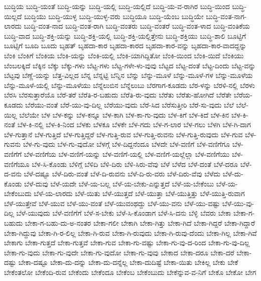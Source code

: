 {ಬುದ್ಧಿಯ
ಬುದ್ಧಿ-ಯಂತೆ
ಬುದ್ಧಿ-ಯನ್ನು
ಬುದ್ಧಿ-ಯಲ್ಲಿ
ಬುದ್ಧಿ-ಯಲ್ಲಿದೆ
ಬುದ್ಧಿ-ಯ-ವ-ರಾಗಿರ
ಬುದ್ಧಿ-ಯಿಂದ
ಬುದ್ಧಿ-ಯಿಲ್ಲದೆ
ಬುದ್ಧಿಯು
ಬುದ್ಧಿ-ಯುಳ್ಳ
ಬುದ್ಧಿ-ಯುಳ್ಳ-ವರು
ಬುದ್ಧಿಯೂ
ಬುದ್ಧಿ-ಯೆಂಬ
ಬುದ್ಧಿಯೇ
ಬುದ್ಧಿ-ವಂತ-ನಾಗ-ಲಾರದು
ಬುದ್ಧಿ-ವಂತ-ನಾದ
ಬುದ್ಧಿ-ವಂತ-ರಾಗಿ
ಬುದ್ಧಿ-ವಂತರು
ಬುದ್ಧಿ-ವಂತರೆ
ಬುದ್ಧಿ-ವಂತ-ಳಾದ
ಬುದ್ಧಿ-ವಂತಿಕೆಯ
ಬುದ್ಧಿ-ವಾದ
ಬುದ್ಧಿ-ಶಕ್ತಿ-ಯನ್ನು
ಬುದ್ಧಿ-ಶಕ್ತಿ-ಯಲ್ಲಿ
ಬುದ್ಧಿ-ಶಕ್ತಿ-ಯಲ್ಲಿತ್ತೇನು
ಬುದ್ಧಿ-ಶಕ್ತಿಯು
ಬುದ್ಧಿ-ಶಾಲಿ
ಬೂಟ್ಟಿಗೆ
ಬೂಟ್ಸಿಗೆ
ಬೂದಿ
ಬೂದು
ಬೃಹತ್
ಬೃಹದಾ-ಕಾರ
ಬೃಹದಾ-ಕಾರದ
ಬೃಹದಾ-ಕಾರ-ವನ್ನು
ಬೃಹದಾ-ಕಾರ-ವಾದದ್ದನ್ನು
ಬೆಂಕಿ
ಬೆಂಕಿಗೆ
ಬೆಂಕಿಯ
ಬೆಂಕಿ-ಯನ್ನು
ಬೆಂಕಿ-ಯಲ್ಲಿ
ಬೆಂಕಿ-ಯಾಗಿದ್ದಿತೋ
ಬೆಂಕಿ-ಯಿಂದ
ಬೆಂಕಿ-ಯಿದೆ
ಬೆಂಕಿಯು
ಬೆಂಬಲಕ್ಕಿದೆ
ಬೆಕ್ಕಿನ
ಬೆಕ್ಕು
ಬೆಕ್ಕು-ಗಳು
ಬೆಟ್ಟ-ಗಳು
ಬೆಟ್ಟ-ಗಳೇ-ಳು-ವುವು
ಬೆಟ್ಟದ
ಬೆಟ್ಟ-ದಂತೆ
ಬೆಟ್ಟ-ದಿಂದು
ಬೆಟ್ಟ-ವನ್ನು
ಬೆಟ್ಟವು
ಬೆಣ್ಣೆ-ಯನ್ನು
ಬೆತ್ತ-ವಿಲ್ಲದ
ಬೆನ್ನ
ಬೆನ್ನಟ್ಟಿ
ಬೆನ್ನಿನ
ಬೆನ್ನು
ಬೆನ್ನು-ಮೂಳೆ
ಬೆನ್ನು-ಮೂಳೆ-ಗಳ
ಬೆನ್ನು-ಮೂಳೆಯ
ಬೆನ್ನು-ಮೂಳೆ-ಯಲ್ಲಿ
ಬೆನ್ನು-ಮೂಳೆಯು
ಬೆನ್ನೆಲುಬಿನ
ಬೆನ್ನೆಲುಬು
ಬೆರಗಾಗ-ಕೂಡದು
ಬೆರ-ಳನ್ನು
ಬೆರಳಿ-ನಲ್ಲಿ
ಬೆರಳು
ಬೆರಸಿ
ಬೆರಸುತ್ತಾರೆಯೊ
ಬೆರೆ-ತರೆ
ಬೆರೆತಿ-ರ-ಬಹುದು
ಬೆರೆತಿ-ರು-ವುದು
ಬೆರೆತು
ಬೆರೆತು-ಹೋಗಿದೆ
ಬೆರೆತೇ
ಬೆರೆಯ-ಕೂಡದು
ಬೆರೆಯು-ವಂತೆ
ಬೆರೆ-ಯು-ವು-ದಿಲ್ಲ
ಬೆರೆಯು-ವುದು
ಬೆರೆ-ಸಿದ
ಬೆರೆಸುತ್ತೀರಿ
ಬೆರೆ-ಸು-ವುದು
ಬೆಲೆ
ಬೆಲೆ-ಯಿಲ್ಲ
ಬೆಲೆಯೇ
ಬೆಳ
ಬೆಳ-ಕನ್ನು
ಬೆಳ-ಕನ್ನೂ
ಬೆಳ-ಕಾಗಿ
ಬೆಳ-ಕಾ-ಗು-ವುದು
ಬೆಳ-ಕಿಗೆ
ಬೆಳ-ಕಿದೆ
ಬೆಳ-ಕಿನ
ಬೆಳ-ಕಿ-ನಂತೆ
ಬೆಳ-ಕಿ-ನಲ್ಲಿ
ಬೆಳ-ಕಿ-ನಿಂದ
ಬೆಳಕು
ಬೆಳಕೂ
ಬೆಳಕೇ
ಬೆಳ-ಗದು
ಬೆಳ-ಗ-ಲಾರ
ಬೆಳ-ಗಲು
ಬೆಳಗಿ
ಬೆಳ-ಗಿ-ದಾಗ
ಬೆಳ-ಗುತ್ತಾನೆ
ಬೆಳ-ಗುತ್ತಿದೆ
ಬೆಳ-ಗುತ್ತಿದ್ದರೆ
ಬೆಳ-ಗುತ್ತಿ-ರುವ
ಬೆಳ-ಗುತ್ತಿ-ರುವನು
ಬೆಳ-ಗುತ್ತಿ-ರುವುದು
ಬೆಳ-ಗುವ
ಬೆಳ-ಗುವನು
ಬೆಳ-ಗು-ವುದು
ಬೆಳ-ಗು-ವುದೋ
ಬೆಳಗ್ಗೆ
ಬೆಳ-ದಿದ್ದನೆಂದೂ
ಬೆಳದೇ
ಬೆಳ-ವಣಿಗೆ
ಬೆಳ-ವಣಿಗೆಗೂ
ಬೆಳ-ವಣಿಗೆಗೆ
ಬೆಳ-ವಣಿಗೆಯ
ಬೆಳ-ವಣಿಗೆ-ಯನ್ನು
ಬೆಳ-ವಣಿಗೆ-ಯಲ್ಲಿ
ಬೆಳ-ವಣಿಗೆ-ಯಲ್ಲೆಲ್ಲಾ
ಬೆಳ-ವಣಿಗೆಯು
ಬೆಳ-ವಣಿಗೆಯೂ
ಬೆಳ-ಸಿ-ಕೊಂಡು
ಬೆಳಿಗ್ಗೆ
ಬೆಳಿದಿ
ಬೆಳಿ-ದಿರು
ಬೆಳಿ-ಸಿರು-ವೆವು
ಬೆಳೆ
ಬೆಳೆದ
ಬೆಳೆ-ದಂತೆ
ಬೆಳೆ-ದರೂ
ಬೆಳೆ-ದ-ವನು
ಬೆಳೆ-ದಷ್ಟೂ
ಬೆಳೆ-ದಿರು-ವಂತೆ
ಬೆಳೆ-ದಿ-ರುವನು
ಬೆಳೆ-ದಿ-ರು-ವರು
ಬೆಳೆ-ದಿರು-ವೆವು
ಬೆಳೆದು
ಬೆಳೆ-ದು-ಕೊಂಡು
ಬೆಳೆ-ದುವು
ಬೆಳೆ-ಯದೇ
ಬೆಳೆ-ಯ-ಬಲ್ಲ
ಬೆಳೆ-ಯ-ಬೇಕು-ಎನ್ನುತ್ತದೆ
ಬೆಳೆ-ಯ-ಬೇಕೆಂಬು
ಬೆಳೆ-ಯ-ಬೇಕೆಂಬುದು
ಬೆಳೆ-ಯ-ಲಾರದು
ಬೆಳೆ-ಯಿತು
ಬೆಳೆ-ಯುತ್ತದೆ
ಬೆಳೆ-ಯುತ್ತಾ
ಬೆಳೆ-ಯುತ್ತಿತ್ತು
ಬೆಳೆ-ಯುತ್ತಿ-ರುವಾಗ
ಬೆಳೆ-ಯುತ್ತೇವೆ
ಬೆಳೆ-ಯುವ
ಬೆಳೆ-ಯು-ವಂತೆ
ಬೆಳೆ-ಯುವಂಥದ್ದು
ಬೆಳೆ-ಯು-ವನು
ಬೆಳೆ-ಯು-ವಷ್ಟು
ಬೆಳೆ-ಯು-ವು-ದಿಲ್ಲ
ಬೆಳೆ-ಯುವುದು
ಬೆಳೆ-ವಣಿಗೆಗೆ
ಬೆಳೆ-ಸ-ಬೇಕು
ಬೆಳೆ-ಸಿ-ಕೊಂಡಾಗ
ಬೆಳೆ-ಸಿ-ದನು
ಬೆಳ್ಳಿ
ಬೆವರು
ಬೇಕಾ
ಬೇಕಾ-ಗ-ಬಹುದು
ಬೇಕಾ-ಗ-ಬಹು-ದು-ಅ-ನಂತರ
ಬೇಕಾ-ಗಲೀ
ಬೇಕಾಗಿ
ಬೇಕಾ-ಗಿತ್ತು
ಬೇಕಾ-ಗಿದೆ
ಬೇಕಾ-ಗಿದ್ದರೆ
ಬೇಕಾ-ಗಿದ್ದಾರೆ
ಬೇಕಾ-ಗಿದ್ದುವು
ಬೇಕಾ-ಗಿ-ರ-ಲಿಲ್ಲ
ಬೇಕಾ-ಗಿ-ರುವ
ಬೇಕಾ-ಗಿ-ರುವುದು
ಬೇಕಾ-ಗಿ-ರುವು-ದೆಂದು
ಬೇಕಾ-ಗಿಲ್ಲ
ಬೇಕಾ-ಗಿವೆ
ಬೇಕಾಗು
ಬೇಕಾ-ಗುತ್ತದೆ
ಬೇಕಾ-ಗುತ್ತವೆ
ಬೇಕಾ-ಗುವ
ಬೇಕಾ-ಗು-ವಷ್ಟು
ಬೇಕಾ-ಗು-ವು-ದ-ರಿಂದ
ಬೇಕಾ-ಗು-ವು-ದಿಲ್ಲ
ಬೇಕಾ-ಗು-ವುದು
ಬೇಕಾ-ಗು-ವುದೇ
ಬೇಕಾ-ಗು-ವುದೋ
ಬೇಕಾ-ಗು-ವುವು
ಬೇಕಾದ
ಬೇಕಾ-ದರೂ
ಬೇಕಾ-ದರೆ
ಬೇಕಾ-ದಷ್ಟು
ಬೇಕಾ-ದಷ್ಟೂ
ಬೇಕಾ-ದು-ದನ್ನು
ಬೇಕಾ-ದು-ದನ್ನೆಲ್ಲ
ಬೇಕಾ-ದುದಿಷ್ಟೆ
ಬೇಕಾ-ಯಿತು
ಬೇಕಿಲ್ಲ
ಬೇಕು
ಬೇಕೆ
ಬೇಕೆಂತಲೋ
ಬೇಕೆಂದಿ-ರುವ
ಬೇಕೆಂದು
ಬೇಕೆಂದೂ
ಬೇಕೆಂಬ
ಬೇಕೆಂಬುದು
ಬೇಕೆನ್ನುವ-ವ-ನಿಗೆ
ಬೇಕೊ
ಬೇಕೋ
ಬೇಗ
}
